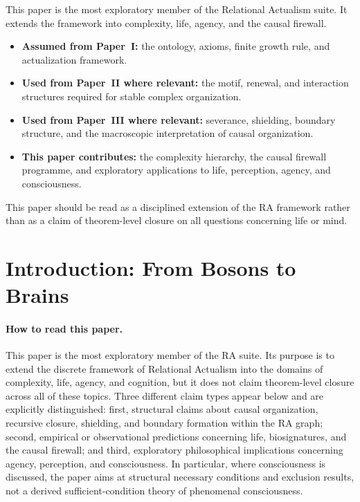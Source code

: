 \documentclass[11pt]{article}
\begin{document}
\begin{tcolorbox}[title=Place of This Paper in the RA Suite,colback=gray!5,colframe=gray!60]
This paper is the most exploratory member of the Relational Actualism suite. It extends the framework into complexity, life, agency, and the causal firewall.
\begin{itemize}[nosep]
    \item \textbf{Assumed from Paper~I:} the ontology, axioms, finite growth rule, and actualization framework.
    \item \textbf{Used from Paper~II where relevant:} the motif, renewal, and interaction structures required for stable complex organization.
    \item \textbf{Used from Paper~III where relevant:} severance, shielding, boundary structure, and the macroscopic interpretation of causal organization.
    \item \textbf{This paper contributes:} the complexity hierarchy, the causal firewall programme, and exploratory applications to life, perception, agency, and consciousness.
\end{itemize}
This paper should be read as a disciplined extension of the RA framework rather than as a claim of theorem-level closure on all questions concerning life or mind.
\end{tcolorbox}

\section{Introduction: From Bosons to Brains}

\paragraph{How to read this paper.}
This paper is the most exploratory member of the RA suite. Its purpose is to extend the discrete framework of Relational Actualism into the domains of complexity, life, agency, and cognition, but it does not claim theorem-level closure across all of these topics. Three different claim types appear below and are explicitly distinguished: first, structural claims about causal organization, recursive closure, shielding, and boundary formation within the RA graph; second, empirical or observational predictions concerning life, biosignatures, and the causal firewall; and third, exploratory philosophical implications concerning agency, perception, and consciousness. In particular, where consciousness is discussed, the paper aims at structural necessary conditions and exclusion results, not a derived sufficient-condition theory of phenomenal consciousness.
\end{document}
